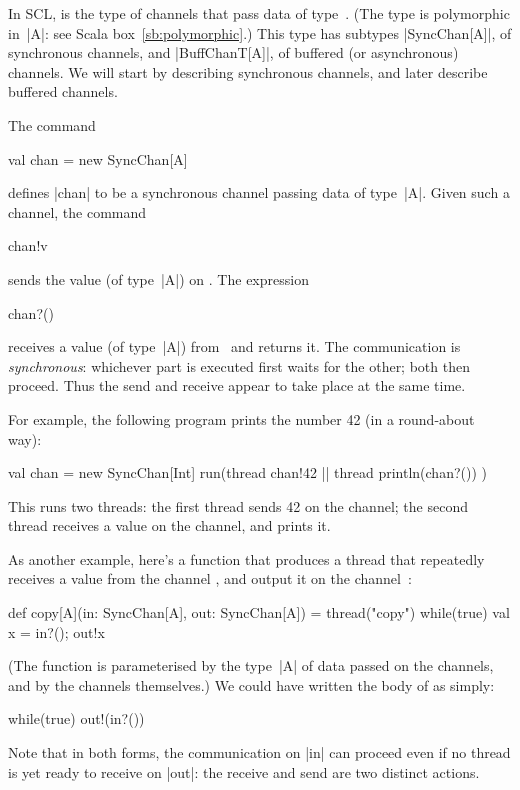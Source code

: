 

In SCL,  is the type of channels that pass data of
type~.  (The type is polymorphic in~|A|: see Scala
box~\ref{sb:polymorphic}.)  This type has subtypes |SyncChan[A]|, of
synchronous channels, and |BuffChanT[A]|, of buffered (or asynchronous)
channels.  We will start by describing synchronous channels, and later
describe buffered channels.

The command
\begin{scala}
  val chan = new SyncChan[A]
\end{scala}
defines |chan| to be a synchronous channel passing data of type~|A|.  Given
such a channel, the command
\begin{scala}
  chan!v
\end{scala}
sends the value  (of type~|A|) on .  The expression
\begin{scala}
  chan?()
\end{scala}
receives a value (of type~|A|) from~ and returns it.  The
communication is
\emph{synchronous}: whichever part is executed first waits for the other; both
then proceed.  Thus the send and receive appear to take place at the same
time.  


For example, the following program prints the number 42 (in a round-about
way): 
\begin{scala}
  val chan = new SyncChan[Int]
  run(thread{ chan!42 } || thread{ println(chan?()) }) 
\end{scala}
%
This runs two threads: the first thread sends 42 on the channel; the second
thread receives a value on the channel, and prints it.


As another example, here's a function that produces a thread that repeatedly
receives a value from the channel , and output it on the
channel~:
%
\begin{scala}
  def copy[A](in: SyncChan[A], out: SyncChan[A]) = thread("copy"){
    while(true){ val x = in?(); out!x }
  }
\end{scala}
%
(The function is parameterised by the type~|A| of data passed on the channels,
and by the channels themselves.)
%
We could have written the body of  as simply:
\begin{scala}
  while(true) out!(in?()) 
\end{scala}
Note that in both forms, the communication on |in| can proceed even if no
thread is yet ready to receive on |out|: the receive and send are two distinct
actions.


